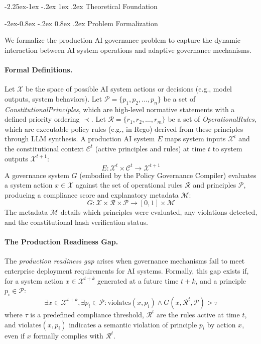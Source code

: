 \documentclass[manuscript,screen,9pt]{acmart}
\makeatletter
\renewcommand\subsection{\@startsection{subsection}{2}{\z@}%
  {-2.25ex\@plus -1ex \@minus -.2ex}%
  {1ex \@plus .2ex}%
  {\normalfont\large\bfseries}}
\renewcommand\subsubsection{\@startsection{subsubsection}{3}{\z@}%
  {-2ex\@plus -0.8ex \@minus -.2ex}%
  {0.8ex \@plus .2ex}%
  {\normalfont\normalsize\bfseries}}
\makeatother
\begin{document}
\subsection{Theoretical Foundation}
\label{subsec:theoretical_foundation}

\subsubsection{Problem Formalization}
\label{subsubsec:problem_formalization}

We formalize the production AI governance problem to capture the dynamic interaction between AI system operations and adaptive governance mechanisms.

\paragraph{Formal Definitions.} Let $\mathcal{X}$ be the space of possible AI system actions or decisions (e.g., model outputs, system behaviors). Let $\mathcal{P} = \{p_1, p_2, \ldots, p_n\}$ be a set of \textit{ConstitutionalPrinciples}, which are high-level normative statements with a defined priority ordering $\prec$. Let $\mathcal{R} = \{r_1, r_2, \ldots, r_m\}$ be a set of \textit{OperationalRules}, which are executable policy rules (e.g., in Rego) derived from these principles through LLM synthesis. A production AI system $E$ maps system inputs $\mathcal{X}^t$ and the constitutional context $\mathcal{C}^t$ (active principles and rules) at time $t$ to system outputs $\mathcal{X}^{t+1}$:
\begin{equation}
E: \mathcal{X}^t \times \mathcal{C}^t \rightarrow \mathcal{X}^{t+1}
\end{equation}
A governance system $G$ (embodied by the Policy Governance Compiler) evaluates a system action $x \in \mathcal{X}$ against the set of operational rules $\mathcal{R}$ and principles $\mathcal{P}$, producing a compliance score and explanatory metadata $\mathcal{M}$:
\begin{equation}
G: \mathcal{X} \times \mathcal{R} \times \mathcal{P} \rightarrow [0,1] \times \mathcal{M}
\end{equation}
The metadata $\mathcal{M}$ details which principles were evaluated, any violations detected, and the constitutional hash verification status.

\paragraph{The Production Readiness Gap.} The \textit{production readiness gap} arises when governance mechanisms fail to meet enterprise deployment requirements for AI systems. Formally, this gap exists if, for a system action $x \in \mathcal{X}^{t+k}$ generated at a future time $t+k$, and a principle $p_i \in \mathcal{P}$:
\[\exists x \in \mathcal{X}^{t+k}, \exists p_i \in \mathcal{P}: \text{violates}(x, p_i) \land G(x, \mathcal{R}^t, \mathcal{P}) > \tau\]
where $\tau$ is a predefined compliance threshold, $\mathcal{R}^t$ are the rules active at time $t$, and $\text{violates}(x, p_i)$ indicates a semantic violation of principle $p_i$ by action $x$, even if $x$ formally complies with $\mathcal{R}^t$.
\end{document}

